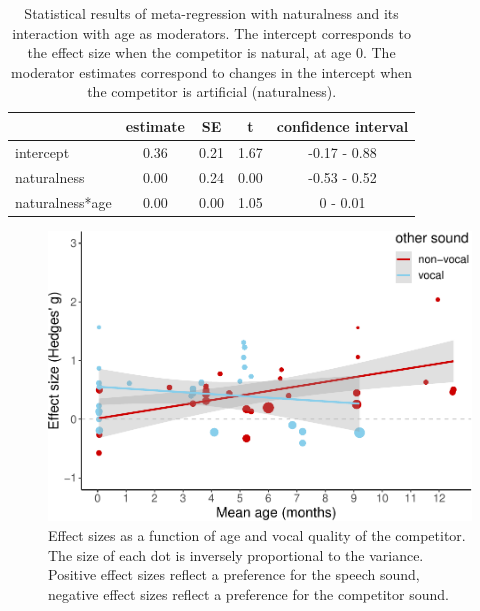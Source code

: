 \documentclass[
  english,
  man]{apa6}
\begin{document}
\begin{table}[tbp]

\begin{center}
\begin{threeparttable}

\caption{\label{tab:TableNatural}Statistical results of meta-regression with naturalness and its interaction with age as moderators. The intercept corresponds to the effect size when the competitor is natural, at age 0. The moderator estimates correspond to changes in the intercept when the competitor is artificial (naturalness).}

\begin{tabular}{lcccc}
\toprule
 & estimate & SE & t & confidence interval\\
\midrule
intercept & 0.36 & 0.21 & 1.67 & -0.17 - 0.88\\
naturalness & 0.00 & 0.24 & 0.00 & -0.53 - 0.52\\
naturalness*age & 0.00 & 0.00 & 1.05 & 0 - 0.01\\
\bottomrule
\end{tabular}

\end{threeparttable}
\end{center}

\end{table}

\begin{figure}
\centering
\includegraphics{MA_speech_pref_files/figure-latex/vocal-1.pdf}
\caption{\label{fig:vocal}Effect sizes as a function of age and vocal quality of the competitor. The size of each dot is inversely proportional to the variance. Positive effect sizes reflect a preference for the speech sound, negative effect sizes reflect a preference for the competitor sound.}
\end{figure}
\end{document}
